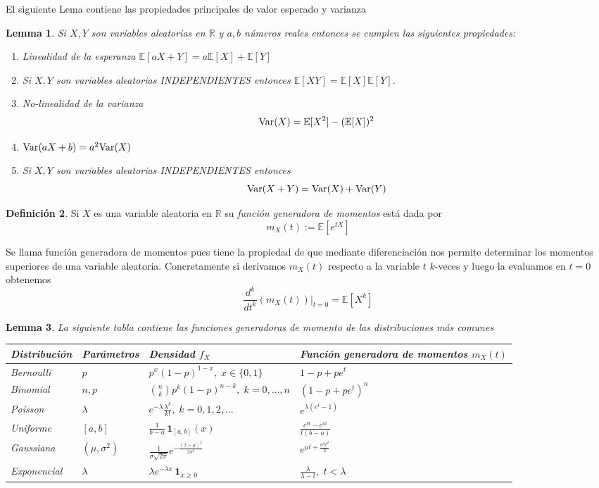\documentclass[12pt]{amsart}
\newtheorem{lemma}{Lemma}[section]
\theoremstyle{definition}
\newtheorem{definition}[lemma]{Definición}
\renewcommand{\geq}{\geqslant}
\newcommand{\RR}{\ensuremath{\mathbb{R}}}
\newcommand{\EE}{\ensuremath{\mathbb{E}}}
\begin{document}
El siguiente Lema contiene las propiedades principales de valor esperado y varianza 

\begin{lemma} Si $X,Y$ son variables aleatorias en $\RR$ y $a,b$ números reales entonces se cumplen las siguientes propiedades:
\begin{enumerate}
\item \emph{Linealidad de la esperanza} $\EE[aX+Y]=a\EE[X]+\EE[Y]$
\item Si $X,Y$ son variables aleatorias INDEPENDIENTES entonces $\EE[XY]=\EE[X]\EE[Y]$.
\item \emph{No-linealidad de la varianza} 
\[{\rm Var}(X)=\EE[X^2]-(\EE[X])^2\]
\item ${\rm Var}(aX+b)=a^2{\rm Var}(X)$
\item Si $X,Y$ son variables aleatorias INDEPENDIENTES entonces 
\[{\rm Var}(X+Y)={\rm Var}(X)+{\rm Var}(Y)\]
\end{enumerate}
\end{lemma}

\begin{definition} Si $X$ es una variable aleatoria en $\RR$ su \emph{función generadora de momentos} está dada por
\[m_X(t):=\EE[e^{tX}]\]
\end{definition}

Se llama función generadora de momentos pues tiene la propiedad de que mediante diferenciación nos permite determinar los momentos superiores de una variable aleatoria. Concretamente si derivamos $m_X(t)$ respecto a la variable $t$ $k$-veces y luego la evaluamos en $t=0$ obtenemos
\[\frac{d^k}{dt^k}(m_X(t))\vert_{t=0}=\EE[X^k]\]


\begin{lemma} La siguiente tabla contiene las funciones generadoras de momento de las distribuciones más comunes
\begin{center}
\small
\setlength{\tabcolsep}{4pt}
\renewcommand{\arraystretch}{1.25}
\begin{tabular}{llll}
\hline
Distribución & Parámetros & Densidad $f_X$ & Función generadora de momentos $m_X(t)$ \\
\hline
Bernoulli & $p$ & $p^x(1-p)^{1-x},\; x\in\{0,1\}$ & $1-p+pe^t$ \\
Binomial & $n,p$ & $\binom{n}{k}p^k(1-p)^{n-k},\; k=0,\dots,n$ & $(1-p+pe^t)^n$ \\
Poisson & $\lambda$ & $e^{-\lambda}\frac{\lambda^k}{k!},\; k=0,1,2,\dots$ & $e^{\lambda(e^t-1)}$ \\
Uniforme & $[a,b]$ & $\frac{1}{b-a}\,\mathbf{1}_{[a,b]}(x)$ & $\frac{e^{bt}-e^{at}}{t(b-a)}$ \\
Gaussiana & $(\mu,\sigma^2)$ & $\frac{1}{\sigma\sqrt{2\pi}}e^{-\frac{(x-\mu)^2}{2\sigma^2}}$ & $e^{\mu t+\frac{\sigma^2 t^2}{2}}$ \\
Exponencial & $\lambda$ & $\lambda e^{-\lambda x}\,\mathbf{1}_{x\geq 0}$ & $\frac{\lambda}{\lambda-t},\; t<\lambda$ \\
\hline
\end{tabular}
\end{center}
\end{lemma}
\end{document}
